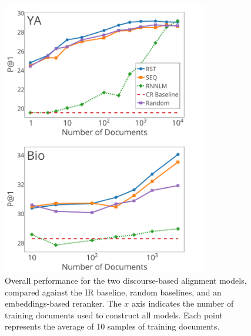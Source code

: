 \begin{figure}[t!]
\begin{center}
\includegraphics[width=90mm]{mainmatter/naacl2015-alignment/graphs_test2a.pdf}
\caption{{\small Overall performance for the two discourse-based alignment models,
compared against the IR baseline, random baselines, and an embeddings-based reranker.
The $x$ axis indicates the number of training documents used to construct all models. 
Each point represents the average of 10 samples of training documents.  }}
\label{fig:performance}
\end{center}
\end{figure}


